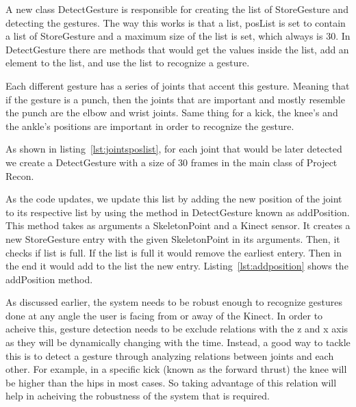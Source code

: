 A new class  DetectGesture is responsible for creating the list of StoreGesture and detecting the gestures. The way this works is that a list, posList is set to contain a list of StoreGesture and a maximum size of the list is set, which always is 30. In DetectGesture there are methods that would get the values inside the list, add an element to the list, and use the list to recognize a gesture.

Each different gesture has a series of joints that accent this gesture. Meaning that if the gesture is a punch, then the joints that are important and mostly resemble the punch are the elbow and wrist joints. Same thing for a kick, the knee's and the ankle's positions are important in order to recognize the gesture.

As shown in listing~\ref{lst:jointsposlist}, for each joint that would be later detected we create a DetectGesture with a size of 30 frames in the main class of Project Recon.



As the code updates, we update this list by adding the new position of the joint to its respective list by using the method in DetectGesture known as addPosition. This method takes as arguments a SkeletonPoint and a Kinect sensor. It creates a new StoreGesture entry with the given SkeletonPoint in its arguments. Then, it checks if list is full. If the list is full it would remove the earliest entery. Then in the end it would add to the list the new entry. Listing~\ref{lst:addposition} shows the addPosition method.



As discussed earlier, the system needs to be robust enough to recognize gestures done at any angle the user is facing from or away of the Kinect. In order to acheive this, gesture detection needs to be exclude relations with the z and x axis as they will be dynamically changing with the time. Instead, a good way to tackle this is to detect a gesture through analyzing relations between joints and each other. For example, in a specific kick (known as the forward thrust) the knee will be higher than the hips in most cases. So taking advantage of this relation will help in acheiving the robustness of the system that is required.

